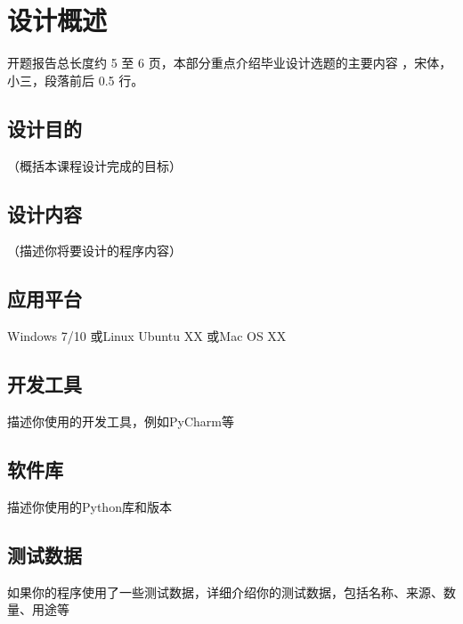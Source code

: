 \documentclass[UTF8,AutoFakeBold,AutoFakeSlant,zihao=-4]{ctexart}
\begin{document}




\newpage
\tableofcontents




\pagestyle{fancy}
\setcounter{page}{1}
\fancyhf{}
\fancyhead[R]{\fontsize{10.5pt}{10.5pt}\selectfont{西北工业大学课程设计（大作业）报告}}
\fancyfoot[R]{\fontsize{9pt}{9pt}\selectfont{\thepage}}
\renewcommand{\headrulewidth}{1pt}
\renewcommand{\footrulewidth}{0pt}

\setlength{\parskip}{0em}
\renewcommand{\baselinestretch}{1.53}
\setlength{\parindent}{1.02cm}

\section{设计概述}
开题报告总长度约 5 至 6 页，本部分重点介绍毕业设计选题的主要内容 \cite{LeCun2010}，宋体，小三，段落前后 0.5 行。
\subsection{设计目的}
（概括本课程设计完成的目标）

\subsection{设计内容}
（描述你将要设计的程序内容）

\subsection{应用平台}
Windows 7/10 或Linux Ubuntu XX 或Mac OS XX

\subsection{开发工具}
描述你使用的开发工具，例如PyCharm等


\subsection{软件库}
描述你使用的Python库和版本


\subsection{测试数据}
如果你的程序使用了一些测试数据，详细介绍你的测试数据，包括名称、来源、数量、用途等
\end{document}
